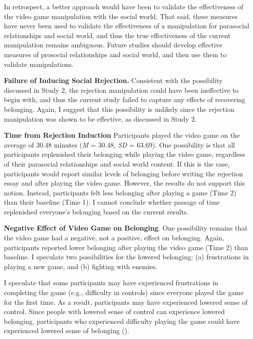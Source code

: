 \documentclass[
]{udthesis}
\begin{document}
In retrospect, a better approach would have been to validate the
effectiveness of the video game manipulation with the social world. That
said, these measures have never been used to validate the effectiveness
of a manipulation for parasocial relationships and social world, and
thus the true effectiveness of the current manipulation remains
ambiguous. Future studies should develop effective measures of prosocial
relationships and social world, and then use them to validate
manipulations.

\textbf{Failure of Inducing Social Rejection.} Consistent with the
possibility discussed in Study 2, the rejection manipulation could have
been ineffective to begin with, and thus the current study failed to
capture any effects of recovering belonging. Again, I suggest that this
possibility is unlikely since the rejection manipulation was shown to be
effective, as discussed in Study 2.

\textbf{Time from Rejection Induction} Participants played the video game on
the average of 30.48 minutes
(\emph{M} = 30.48, \emph{SD} = 63.69). One possibility is that all participants
replenished their belonging while playing the video game, regardless of
their parasocial relationships and social world content. If this is the
case, participants would report similar levels of belonging before
writing the rejection essay and after playing the video game. However,
the results do not support this notion. Instead, participants felt less
belonging after playing a game (Time 2) than their baseline (Time 1). I
cannot conclude whether passage of time replenished everyone's belonging
based on the current results.

\textbf{Negative Effect of Video Game on Belonging}. One possibility remains
that the video game had a negative, not a positive, effect on belonging.
Again, participants reported lower belonging after playing the video
game (Time 2) than baseline. I speculate two possibilities for the
lowered belonging: (a) frustrations in playing a new game, and (b)
fighting with enemies.

I speculate that some participants may have experienced frustrations in
completing the game (e.g., difficulty in controls) since everyone played
the game for the first time. As a result, participants may have
experienced lowered sense of control. Since people with lowered sense of
control can experience lowered belonging, participants who experienced
difficulty playing the game could have experienced lowered sense of
belonging ().
\end{document}
